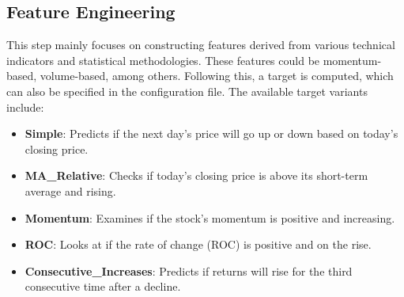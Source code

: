 \subsection{Feature Engineering}
This step mainly focuses on constructing features derived from various technical indicators and statistical methodologies. These features could be momentum-based, volume-based, among others. Following this, a target is computed, which can also be specified in the configuration file. The available target variants include:
\begin{itemize}
    \item \textbf{Simple}: Predicts if the next day's price will go up or down based on today's closing price.
    \item \textbf{MA\_Relative}: Checks if today's closing price is above its short-term average and rising.
    \item \textbf{Momentum}: Examines if the stock's momentum is positive and increasing.
    \item \textbf{ROC}: Looks at if the rate of change (ROC) is positive and on the rise.
    \item \textbf{Consecutive\_Increases}: Predicts if returns will rise for the third consecutive time after a decline.
\end{itemize}


